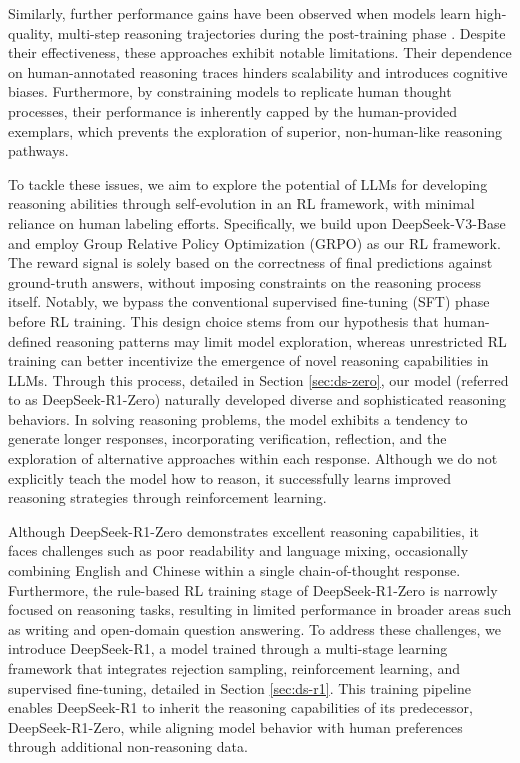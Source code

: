  Similarly, further performance gains have been observed when models learn high-quality, multi-step reasoning trajectories during the post-training phase \citep{gpt4,chung2024scaling}. Despite their effectiveness, these approaches exhibit notable limitations. Their dependence on human-annotated reasoning traces hinders scalability and introduces cognitive biases. Furthermore, by constraining models to replicate human thought processes, their performance is inherently capped by the human-provided exemplars, which prevents the exploration of superior, non-human-like reasoning pathways.

To tackle these issues, we aim to explore the potential of LLMs for developing reasoning abilities through self-evolution in an RL framework, with minimal reliance on human labeling efforts. Specifically, we build upon DeepSeek-V3-Base \citep{dsviii} and employ Group Relative Policy Optimization (GRPO) \citep{deepseekmath} as our RL framework. The reward signal is solely based on the correctness of final predictions against ground-truth answers, without imposing constraints on the reasoning process itself. Notably, we bypass the conventional supervised fine-tuning (SFT) phase before RL training. This design choice stems from our hypothesis that human-defined reasoning patterns may limit model exploration, whereas unrestricted RL training can better incentivize the emergence of novel reasoning capabilities in LLMs. Through this process, detailed in Section \ref{sec:ds-zero}, our model (referred to as DeepSeek-R1-Zero) naturally developed diverse and sophisticated reasoning behaviors. In solving reasoning problems, the model exhibits a tendency to generate longer responses, incorporating verification, reflection, and the exploration of alternative approaches within each response. Although we do not explicitly teach the model how to reason, it successfully learns improved reasoning strategies through reinforcement learning.

Although DeepSeek-R1-Zero demonstrates excellent reasoning capabilities, it faces challenges such as poor readability and language mixing, occasionally combining English and Chinese within a single chain-of-thought response. Furthermore, the rule-based RL training stage of DeepSeek-R1-Zero is narrowly focused on reasoning tasks, resulting in limited performance in broader areas such as writing and open-domain question answering. To address these challenges, we introduce DeepSeek-R1, a model trained through a multi-stage learning framework that integrates rejection sampling, reinforcement learning, and supervised fine-tuning, detailed in Section \ref{sec:ds-r1}. This training pipeline enables DeepSeek-R1 to inherit the reasoning capabilities of its predecessor, DeepSeek-R1-Zero, while aligning model behavior with human preferences through additional non-reasoning data. 

